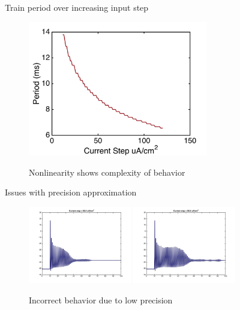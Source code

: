 \documentclass{beamer}
\begin{document}
\begin{frame}{Train period over increasing input step}
\begin{figure}
    \centering
    \includegraphics[width = 0.7\textwidth]{./images/periodvscurrent.jpg}

    Nonlinearity shows complexity of behavior
  \end{figure}

\end{frame}


\begin{frame}{Issues with precision approximation}
  \begin{figure}
    \centering
    \includegraphics[width = 0.4\textwidth]{./images/current55p5.jpg}
    \includegraphics[width = 0.4\textwidth]{./images/current55p6.jpg}

    Incorrect behavior due to low precision
  \end{figure}
\end{frame}
\end{document}
